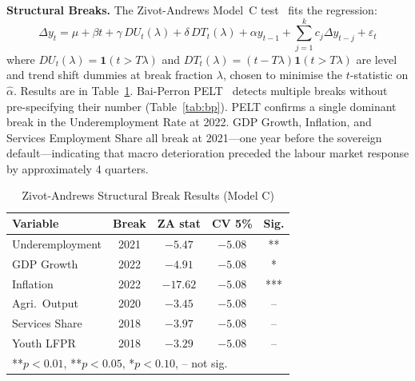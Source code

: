 \documentclass[sigconf]{acmart}
\begin{document}
\textbf{Structural Breaks.} The Zivot-Andrews Model~C test~\cite{zivot1992} fits the regression:
%
\begin{equation}
  \Delta y_t = \mu + \beta t + \gamma\, DU_t(\lambda) + \delta\, DT_t(\lambda)
              + \alpha y_{t-1} + \sum_{j=1}^{k} c_j \Delta y_{t-j} + \varepsilon_t
  \label{eq:za}
\end{equation}
%
where $DU_t(\lambda){=}\mathbf{1}(t{>}T\lambda)$ and $DT_t(\lambda){=}(t{-}T\lambda)\mathbf{1}(t{>}T\lambda)$ are level and trend shift dummies at break fraction $\lambda$, chosen to minimise the $t$-statistic on $\hat{\alpha}$. Results are in Table~\ref{tab:za}. Bai-Perron PELT~\cite{pesaran2001} detects multiple breaks without pre-specifying their number (Table~\ref{tab:bp}). PELT confirms a single dominant break in the Underemployment Rate at 2022. GDP Growth, Inflation, and Services Employment Share all break at 2021---one year before the sovereign default---indicating that macro deterioration preceded the labour market response by approximately 4 quarters.

\begin{table}[h]
\caption{Zivot-Andrews Structural Break Results (Model C)}
\label{tab:za}
\setlength{\tabcolsep}{3pt}
\footnotesize
\begin{tabular}{lcccc}
\toprule
\textbf{Variable} & \textbf{Break} & \textbf{ZA stat} & \textbf{CV 5\%} & \textbf{Sig.}\\
\midrule
Underemployment  & 2021 & $-5.47$ & $-5.08$ & **  \\
GDP Growth       & 2022 & $-4.91$ & $-5.08$ & *   \\
Inflation        & 2022 & $-17.62$ & $-5.08$ & *** \\
Agri.\ Output    & 2020 & $-3.45$ & $-5.08$ & --  \\
Services Share   & 2018 & $-3.97$ & $-5.08$ & --  \\
Youth LFPR       & 2018 & $-3.29$ & $-5.08$ & --  \\
\midrule
\multicolumn{5}{l}{\scriptsize ***$p{<}0.01$, **$p{<}0.05$, *$p{<}0.10$, -- not sig.}\\
\bottomrule
\end{tabular}
\end{table}
\end{document}
